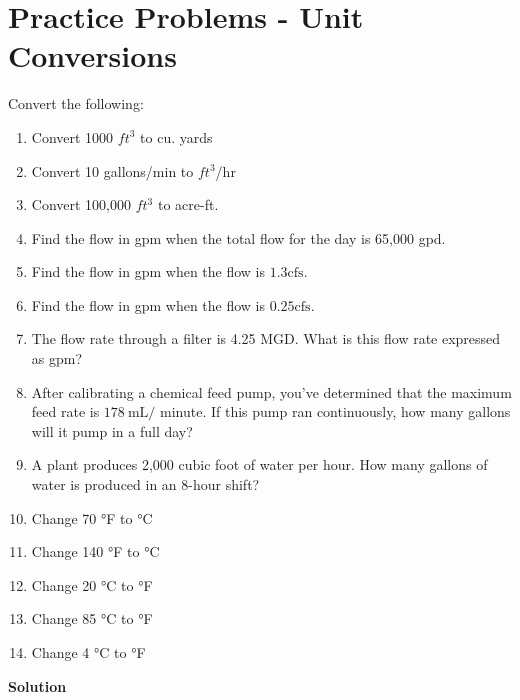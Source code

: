 \section*{Practice Problems - Unit Conversions}
Convert the following:\\
\begin{enumerate}
\item Convert 1000 $ft^3$ to cu. yards\\

\item Convert 10 gallons/min to $ft^3$/hr\\

\item Convert 100,000 $ft^3$ to acre-ft.\\

\item Find the flow in gpm when the total flow for the day is 65,000 gpd.

\item Find the flow in gpm when the flow is $1.3 \mathrm{cfs}$.

\item Find the flow in gpm when the flow is $0.25 \mathrm{cfs}$.

\item The flow rate through a filter is 4.25 MGD. What is this flow rate expressed as gpm?\\

\item After calibrating a chemical feed pump, you've determined that the maximum feed rate is $178 \mathrm{~mL} /$ minute. If this pump ran continuously, how many gallons will it pump in a full day?

\item A plant produces 2,000 cubic foot of water per hour. How many gallons of water is produced in an 8-hour shift?

\item Change 70 °F to °C
\item Change 140 °F to °C
\item Change 20 °C to °F
\item Change 85 °C to °F
\item Change 4 °C to °F
\end{enumerate}
\textbf{Solution}
